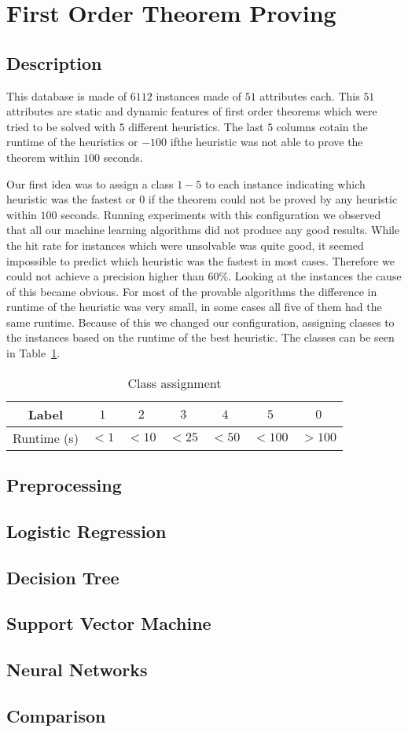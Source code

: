 \section{First Order Theorem Proving}
\label{db:sec:ds2}
\subsection{Description}
This database is made of $6112$ instances made of $51$ attributes each. This $51$ attributes are static and dynamic features of first order theorems which were tried to be solved with $5$ different heuristics. The last $5$ columns cotain the runtime of the heuristics or $-100$ ifthe heuristic was not able to prove the theorem within $100$ seconds.\par
Our first idea was to assign a class $1-5$ to each instance indicating which heuristic was the fastest or $0$ if the theorem could not be proved by any heuristic within $100$ seconds. Running experiments with this configuration we observed that all our machine learning algorithms did not produce any good results. While the hit rate for instances which were unsolvable was quite good, it seemed impossible to predict which heuristic was the fastest in most cases. Therefore we could not achieve a precision higher than $60\%$.
Looking at the instances the cause of this became obvious. For most of the provable algorithms the difference in runtime of the heuristic was very small, in some cases all five of them had the same runtime. Because of this we changed our configuration, assigning classes to the instances based on the runtime of the best heuristic. The classes can be seen in Table~\ref{ds2:table:classes}.
\begin{table}[h]
	\begin{center}
	\begin{tabular}{c|c|c|c|c|c|c}

		Label & $1$ & $2$ & $3$ & $4$ & $5$& $0$\\\hline
		Runtime (s) & $<1$ & $<10$ & $<25$ & $<50$ &$<100$ &$>100$\\
	\end{tabular}
\end{center}
	\caption{Class assignment \label{ds2:table:classes}}
\end{table}
\subsection{Preprocessing}

\subsection{Logistic Regression}

\subsection{Decision Tree}

\subsection{Support Vector Machine}

\subsection{Neural Networks}

\subsection{Comparison}
